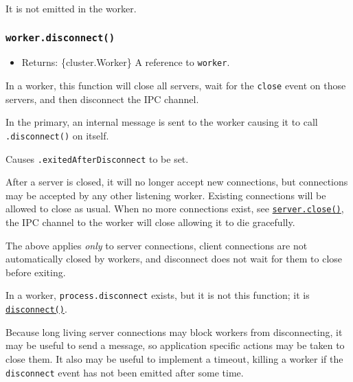 It is not emitted in the worker.

\subsubsection{\texorpdfstring{\texttt{worker.disconnect()}}{worker.disconnect()}}\label{worker.disconnect}

\begin{itemize}
\tightlist
\item
  Returns: \{cluster.Worker\} A reference to \texttt{worker}.
\end{itemize}

In a worker, this function will close all servers, wait for the
\texttt{\textquotesingle{}close\textquotesingle{}} event on those
servers, and then disconnect the IPC channel.

In the primary, an internal message is sent to the worker causing it to
call \texttt{.disconnect()} on itself.

Causes \texttt{.exitedAfterDisconnect} to be set.

After a server is closed, it will no longer accept new connections, but
connections may be accepted by any other listening worker. Existing
connections will be allowed to close as usual. When no more connections
exist, see \href{net.md\#event-close}{\texttt{server.close()}}, the IPC
channel to the worker will close allowing it to die gracefully.

The above applies \emph{only} to server connections, client connections
are not automatically closed by workers, and disconnect does not wait
for them to close before exiting.

In a worker, \texttt{process.disconnect} exists, but it is not this
function; it is
\href{child_process.md\#subprocessdisconnect}{\texttt{disconnect()}}.

Because long living server connections may block workers from
disconnecting, it may be useful to send a message, so application
specific actions may be taken to close them. It also may be useful to
implement a timeout, killing a worker if the
\texttt{\textquotesingle{}disconnect\textquotesingle{}} event has not
been emitted after some time.

